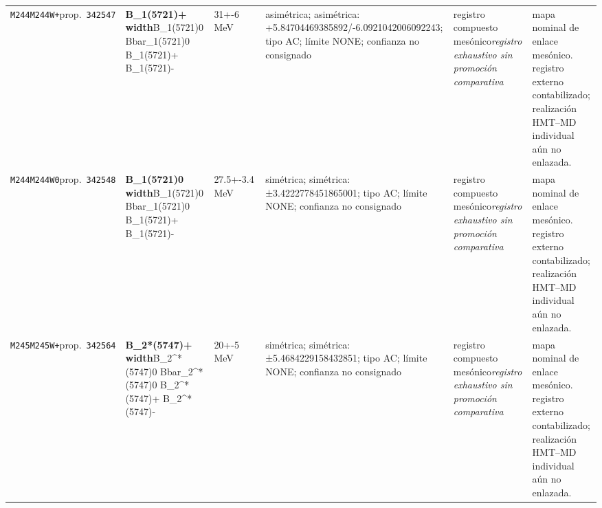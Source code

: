 \begin{landscape}
\begin{longtable}{L{1.85cm}L{4.45cm}L{2.35cm}L{4.05cm}L{3.35cm}L{7.15cm}}
\texttt{M244}\newline \texttt{M244W+}\newline prop.\ \texttt{342547} & \textbf{B\_\allowbreak{}1(5721)+ width}\newline B\_\allowbreak{}1(5721)0 \textbar{}\allowbreak{} Bbar\_\allowbreak{}1(5721)0 \textbar{}\allowbreak{} B\_\allowbreak{}1(5721)+ \textbar{}\allowbreak{} B\_\allowbreak{}1(5721)- & 31+-6\,MeV & asimétrica; asimétrica: +5.84704469385892/-6.0921042006092243; tipo AC; límite NONE; confianza no consignado & registro compuesto mesónico\newline \emph{registro exhaustivo sin promoción comparativa} & mapa nominal de enlace mesónico. registro externo contabilizado; realización HMT--MD individual aún no enlazada. \\
\texttt{M244}\newline \texttt{M244W0}\newline prop.\ \texttt{342548} & \textbf{B\_\allowbreak{}1(5721)0 width}\newline B\_\allowbreak{}1(5721)0 \textbar{}\allowbreak{} Bbar\_\allowbreak{}1(5721)0 \textbar{}\allowbreak{} B\_\allowbreak{}1(5721)+ \textbar{}\allowbreak{} B\_\allowbreak{}1(5721)- & 27.5+-3.4\,MeV & simétrica; simétrica: ±3.4222778451865001; tipo AC; límite NONE; confianza no consignado & registro compuesto mesónico\newline \emph{registro exhaustivo sin promoción comparativa} & mapa nominal de enlace mesónico. registro externo contabilizado; realización HMT--MD individual aún no enlazada. \\
\texttt{M245}\newline \texttt{M245W+}\newline prop.\ \texttt{342564} & \textbf{B\_\allowbreak{}2*(5747)+ width}\newline B\_\allowbreak{}2\textasciicircum{}*(5747)0 \textbar{}\allowbreak{} Bbar\_\allowbreak{}2\textasciicircum{}*(5747)0 \textbar{}\allowbreak{} B\_\allowbreak{}2\textasciicircum{}*(5747)+ \textbar{}\allowbreak{} B\_\allowbreak{}2\textasciicircum{}*(5747)- & 20+-5\,MeV & simétrica; simétrica: ±5.4684229158432851; tipo AC; límite NONE; confianza no consignado & registro compuesto mesónico\newline \emph{registro exhaustivo sin promoción comparativa} & mapa nominal de enlace mesónico. registro externo contabilizado; realización HMT--MD individual aún no enlazada. \\

\end{longtable}
\end{landscape}
